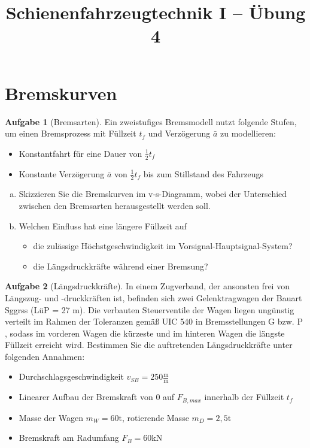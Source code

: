 \documentclass[10pt,a4paper,headsepline,smallheadings]{scrartcl}
\title{Schienenfahrzeugtechnik I  -- \"Ubung 4}
\date{}
\theoremstyle{definition}
\newtheorem{aufgabe}{Aufgabe}
\begin{document}
\thispagestyle{empty}
\maketitle
\vspace{-2cm}

\section*{Bremskurven}
\begin{aufgabe}[Bremsarten]
Ein zweistufiges Bremsmodell nutzt folgende Stufen, um einen Bremsprozess mit Füllzeit $t_f$ und Verzögerung $\bar{a}$ zu modellieren:
\begin{itemize}
	\item Konstantfahrt für eine Dauer von $\frac12 t_f$
	\item Konstante Verzögerung $\bar{a}$ von $\frac12 t_f$ bis zum Stillstand des Fahrzeugs
\end{itemize}
\begin{enumerate}[a)]
\item Skizzieren Sie die Bremskurven im v-s-Diagramm, wobei der Unterschied zwischen den Bremsarten herausgestellt werden soll.
\item Welchen Einfluss hat eine l\"angere F\"ullzeit auf
\begin{itemize}
	\item die zul\"assige H\"ochstgeschwindigkeit im Vorsignal-Hauptsignal-System?
	\item die L\"angsdruckkr\"afte w\"ahrend einer Bremsung?
\end{itemize}
\end{enumerate}
\end{aufgabe}
\vspace{.5cm}
\begin{aufgabe}[L\"angsdruckkr\"afte]
In einem Zugverband, der ansonsten frei von L\"angszug- und -druckkr\"aften ist, befinden sich zwei Gelenktragwagen der Bauart Sggrss (L\"uP = 27 m). Die verbauten Steuerventile der Wagen liegen ung\"unstig verteilt im Rahmen der Toleranzen gem\"a{\ss} UIC 540 in Bremsstellungen G bzw. P , sodass im vorderen Wagen die k\"urzeste und im hinteren Wagen die l\"angste F\"ullzeit erreicht wird. Bestimmen Sie die auftretenden L\"angsdruckkr\"afte unter folgenden Annahmen:
\begin{itemize}
	\item Durchschlagsgeschwindigkeit $v_{SB} = 250 \frac{\mathrm{m}}{\mathrm{m}}$
	\item Linearer Aufbau der Bremskraft von $0$ auf $F_{B, max}$ innerhalb der F\"ullzeit $t_{f}$
	\item Masse der Wagen $m_{W} = 60 \mathrm{t}$, rotierende Masse $m_{D} = 2{,}5 \mathrm{t}$
	\item Bremskraft am Radumfang $F_{B} = 60 \mathrm{kN}$
\end{itemize}
\end{aufgabe}
\end{document}
